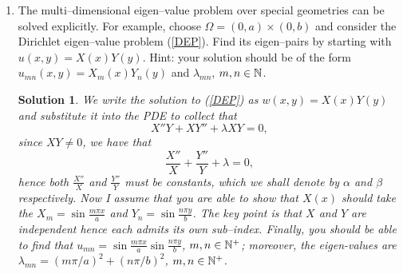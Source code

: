 \documentclass[6pt]{article}
\newtheorem{solution}{Solution}
\numberwithin{equation}{section}
\def\mathbb{\Bbb}
\begin{document}
\begin{enumerate}
\item The multi--dimensional eigen--value problem over special geometries can be solved explicitly.  For example, choose $\Omega=(0,a)\times(0,b)$ and consider the Dirichlet eigen--value problem (\ref{DEP}).  Find its eigen--pairs by starting with $u(x,y)=X(x)Y(y)$.  Hint: your solution should be of the form $u_{mn}(x,y)=X_m(x)Y_n(y)$ and $\lambda_{mn}$, $m,n\in\mathbb N$.
    \begin{solution}
We write the solution to (\ref{DEP}) as $w(x,y)=X(x)Y (y)$ and substitute it into the PDE to collect
that
\[X''Y+XY''+\lambda XY=0,\]
since $XY \neq 0$, we have that
\[\frac{X''}{X}+\frac{Y''}{Y}+\lambda=0,\]
hence both $\frac{X''}{X}$ and $\frac{Y''}{Y}$ must be constants, which we shall denote by $\alpha$ and $\beta$ respectively.  Now I assume that you are able to show that $X(x)$ should take the
$X_m=\sin \frac{m\pi x}{a}$  and $Y_n=\sin \frac{n\pi y}{b}$.  The key point is that $X$ and $Y$ are independent hence each admits its own sub--index.   Finally, you should be able to find that $u_{mn}=\sin \frac{m\pi x}{a}\sin \frac{n\pi y}{b}$, $m,n\in\mathbb N^+$; moreover, the eigen-values are $\lambda_{mn}=(m\pi/a)^2+(n\pi/b)^2$, $m,n\in\mathbb N^+$.
\end{solution}


\end{enumerate}
\end{document}
